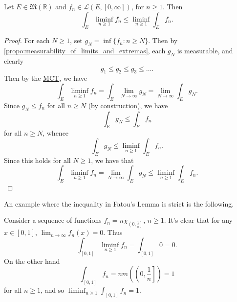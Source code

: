 \documentclass[notoc,notitlepage]{tufte-book}
\begin{document}
\begin{thm}\label{thm:fatou_s_lemma}
  Let $E \in \mathfrak{M}(\mathbb{R})$ and $f_n \in \mathcal{L}(E, [0,
  \infty])$, for $n \geq 1$. Then
  \begin{equation*}
    \int_{E} \liminf_{n \geq 1} f_n \leq \liminf_{n \geq 1} \int_{E} f_n.
  \end{equation*}
\end{thm}

\begin{proof}
  For each $N \geq 1$, set $g_N = \inf \{ f_n : n \geq N \}$. Then by
  \cref{propo:measurability_of_limits_and_extremas}, each $g_N$ is measurable,
  and clearly
  \begin{equation*}
    g_1 \leq g_2 \leq g_3 \leq \hdots.
  \end{equation*}
  Then by the \hyperref[thm:the_monotone_convergence_theorem]{MCT}, we have
  \begin{equation*}
    \int_{E} \liminf_{n \geq 1} f_n = \int_{E} \lim_{N \to \infty} g_N = \lim_{N
    \to \infty} \int_{E} g_N.
  \end{equation*}
  Since $g_N \leq f_n$ for all $n \geq N$ (by construction), we have
  \begin{equation*}
    \int_{E} g_N \leq \int_{E} f_n
  \end{equation*}
  for all $n \geq N$, whence
  \begin{equation*}
    \int_{E} g_N \leq \liminf_{n \geq 1} \int_{E} f_n.
  \end{equation*}
  Since this holds for all $N \geq 1$, we have that
  \begin{equation*}
    \int_{E} \liminf_{n \geq 1} f_n = \lim_{N \to \infty} \int_{E} g_N \leq
    \liminf_{n \geq 1} \int_{E} f_n.
  \end{equation*}
\end{proof}

An example where the inequality in Fatou's Lemma is strict is the following.

\begin{eg}
  Consider a sequence of functions $f_n = n\chi_{\left(0, \frac{1}{n}\right]}$,
  $n \geq 1$. It's clear that for any $x \in [0, 1]$, $\lim_{n \to \infty}
  f_n(x) = 0$. Thus
  \begin{equation*}
    \int_{[0, 1]} \liminf_{n \geq 1} f_n = \int_{[0, 1]} 0 = 0.
  \end{equation*}
  On the other hand
  \begin{equation*}
    \int_{[0, 1]} f_n = n m \left( \left( 0, \frac{1}{n} \right] \right) = 1
  \end{equation*}
  for all $n \geq 1$, and so $\liminf_{n \geq 1} \int_{[0, 1]} f_n = 1$.
\end{eg}
\end{document}
